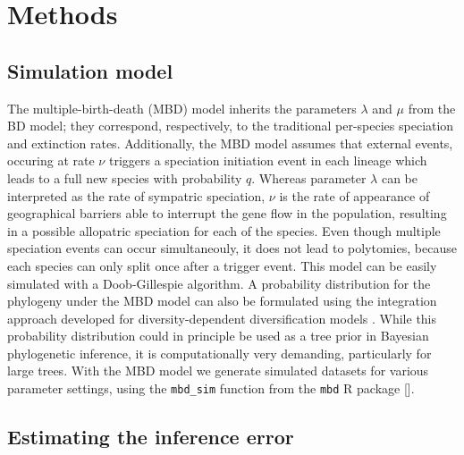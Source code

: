 \section{Methods}

\subsection{Simulation model}

The multiple-birth-death (MBD) model inherits the parameters $\lambda$ and $\mu$ from the BD model; they correspond, respectively, 
to the traditional per-species speciation and extinction rates. 
Additionally, the MBD model assumes that external events, occuring at rate $\nu$ triggers a speciation initiation event in each lineage which leads to a full new species with probability $q$. 
Whereas parameter $\lambda$ can be interpreted as the rate of sympatric speciation, $\nu$ is the rate of appearance of 
geographical barriers able to interrupt the gene flow in the population,
resulting in a possible allopatric speciation for each of the species.  
Even though multiple speciation events can occur simultaneouly, it does not lead to  
polytomies, because each species can only split once after a trigger event. This model can be easily simulated with a Doob-Gillespie algorithm. A probability distribution for the phylogeny under the MBD model can also be formulated using the integration approach developed for diversity-dependent diversification models \citep{etienne2012diversity}. While this probability distribution could in principle be used as a tree prior in Bayesian phylogenetic inference, it is computationally very demanding, particularly for large trees. With the MBD model we generate simulated datasets for various parameter settings, using the \verb;mbd_sim; function from the \verb;mbd; R package [\citep{mbd}].

\subsection{Estimating the inference error}

